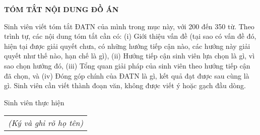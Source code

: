 \documentclass[../main.tex]{subfiles}
\begin{document}
\begin{center}
    \Large{\textbf{TÓM TẮT NỘI DUNG ĐỒ ÁN}}\\
\end{center}
\vspace{1cm}
Sinh viên viết tóm tắt ĐATN của mình trong mục này, với 200 đến 350 từ. Theo trình tự, các nội dung tóm tắt cần có: (i) Giới thiệu vấn đề (tại sao có vấn đề đó, hiện tại được giải quyết chưa, có những hướng tiếp cận nào, các hướng này giải quyết như thế nào, hạn chế là gì), (ii) Hướng tiếp cận sinh viên lựa chọn là gì, vì sao chọn hướng đó, (iii) Tổng quan giải pháp của sinh viên theo hướng tiếp cận đã chọn, và (iv) Đóng góp chính của ĐATN là gì, kết quả đạt được sau cùng là gì. Sinh viên cần viết thành đoạn văn, không được viết ý hoặc gạch đầu dòng.

\begin{flushright}
Sinh viên thực hiện\\
\begin{tabular}{@{}c@{}}
\textit{(Ký và ghi rõ họ tên)}
\end{tabular}
\end{flushright}
\end{document}
